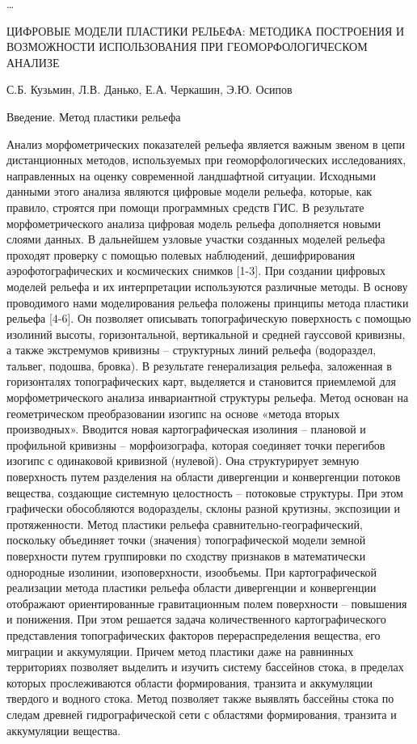 \documentclass[runningheads]{AIIT}
\begin{document}
…

ЦИФРОВЫЕ МОДЕЛИ ПЛАСТИКИ РЕЛЬЕФА:
МЕТОДИКА ПОСТРОЕНИЯ И ВОЗМОЖНОСТИ ИСПОЛЬЗОВАНИЯ ПРИ ГЕОМОРФОЛОГИЧЕСКОМ АНАЛИЗЕ

С.Б. Кузьмин, Л.В. Данько, Е.А. Черкашин, Э.Ю. Осипов

Введение. Метод пластики рельефа

Анализ морфометрических показателей рельефа является важным звеном в цепи дистанционных методов, используемых при геоморфологических исследованиях, направленных на оценку современной ландшафтной ситуации. Исходными данными этого анализа являются цифровые модели рельефа, которые, как правило, строятся при помощи программных средств ГИС. В результате морфометрического анализа цифровая модель рельефа дополняется новыми слоями данных. В дальнейшем узловые участки созданных моделей рельефа проходят проверку с помощью полевых наблюдений, дешифрирования аэрофотографических и космических снимков [1-3].
При создании цифровых моделей рельефа и их интерпретации используются различные методы. В основу проводимого нами моделирования рельефа положены принципы метода пластики рельефа [4-6]. Он позволяет описывать топографическую поверхность с помощью изолиний высоты, горизонтальной, вертикальной и средней гауссовой кривизны, а также экстремумов кривизны – структурных линий рельефа (водораздел, тальвег, подошва, бровка). В результате генерализация рельефа, заложенная в горизонталях топографических карт, выделяется и становится приемлемой для морфометрического анализа инвариантной структуры рельефа. Метод основан на геометрическом преобразовании изогипс на основе «метода вторых производных». Вводится новая картографическая изолиния – плановой и профильной кривизны – морфоизографа, которая соединяет точки перегибов изогипс с одинаковой кривизной (нулевой). Она структурирует земную поверхность путем разделения на области дивергенции и конвергенции потоков вещества, создающие системную целостность – потоковые структуры. При этом графически обособляются водоразделы, склоны разной крутизны, экспозиции и протяженности. Метод пластики рельефа сравнительно-географический, поскольку объединяет точки (значения) топографической модели земной поверхности путем группировки по сходству признаков в математически однородные изолинии, изоповерхности, изообъемы.
При картографической реализации метода пластики рельефа области дивергенции и конвергенции отображают ориентированные гравитационным полем поверхности – повышения и понижения. При этом решается задача количественного картографического представления топографических факторов перераспределения вещества, его миграции и аккумуляции. Причем метод пластики даже на равнинных территориях позволяет выделить и изучить систему бассейнов стока, в пределах которых прослеживаются области формирования, транзита и аккумуляции твердого и водного стока. Метод позволяет также выявлять бассейны стока по следам древней гидрографической сети с областями формирования, транзита и аккумуляции вещества.
\end{document}
